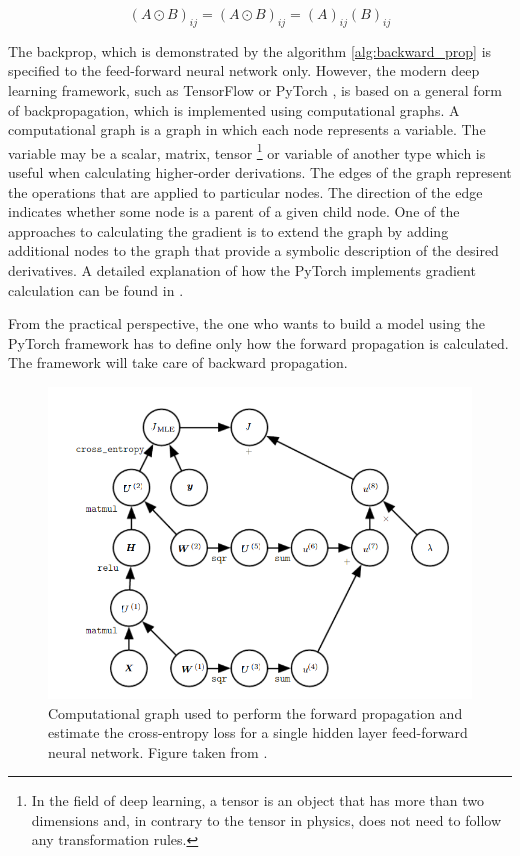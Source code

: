 \begin{equation}
    (A \odot B)_{ij} = (A \odot B)_{ij} = (A)_{ij} (B)_{ij}
\end{equation}

The backprop, which is demonstrated by the algorithm \ref{alg:backward_prop} is specified to the feed-forward neural network only. However, the modern deep learning framework, such as TensorFlow \cite{tensorflow} or PyTorch \cite{pytorch}, is based on a general form of backpropagation, which is implemented using computational graphs. 
A computational graph is a graph in which each node represents a variable. The variable may be a scalar, matrix,  tensor \footnote{In the field of deep learning, a tensor is an object that has more than two dimensions and, in contrary to the tensor in physics, does not need to follow any transformation rules.} or variable of another type which is useful when calculating higher-order derivations.    
The edges of the graph represent the operations that are applied to particular nodes. The direction of the edge indicates whether some node is a parent of a given child node. 
One of the approaches to calculating the gradient is to extend the graph by adding additional nodes to the graph that provide a symbolic description of the desired derivatives. A detailed explanation of how the PyTorch implements gradient calculation can be found in \cite{autograd}. 

From the practical perspective, the one who wants to build a model using the PyTorch framework has to define only how the forward propagation is calculated. The framework will take care of backward propagation.

\begin{figure}[!ht]
\centering
\includegraphics[width=\textwidth]{figures/Comput_graph.PNG}
\caption{Computational graph used to perform the forward propagation and estimate the cross-entropy loss for a single hidden layer feed-forward neural network. Figure taken from \cite{DLBook}.
}
\label{fig:Comput_graph}
\end{figure} 

